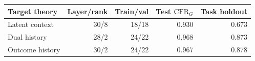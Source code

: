\begin{tabular}{lrrrr}
\toprule
Target theory & Layer/rank & Train/val & Test $\mathrm{CFR}_G$ & Task holdout \\
\midrule
Latent context & 30/8 & 18/18 & 0.930 & 0.673 \\
Dual history & 28/2 & 24/22 & 0.968 & 0.873 \\
Outcome history & 30/2 & 24/22 & 0.967 & 0.878 \\
\bottomrule
\end{tabular}
